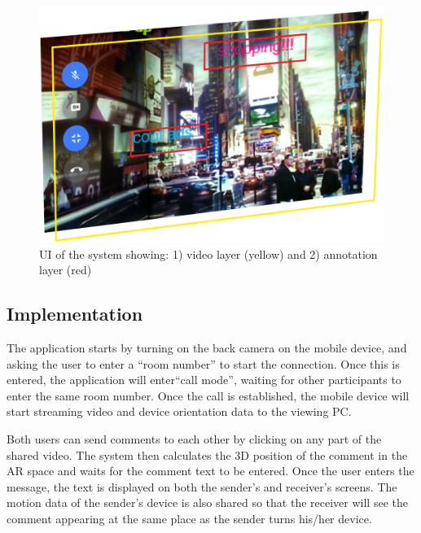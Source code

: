 \begin{figure}[h]
  \centering
  \includegraphics[width=.8\linewidth]{images/mgia16/layers.png}
  \caption{UI of the system showing: 1) video layer (yellow) and 2) annotation layer (red)}
	\label{fig:mgia16:layers}
\end{figure}

\subsection{Implementation}

The application starts by turning on the back camera on the mobile device, and asking the user to enter a “room number” to start the connection. Once this is entered, the application will enter``call mode'', waiting for other participants to enter the same room number. Once the call is established, the mobile device will start streaming video and device orientation data to the viewing PC. 

Both users can send comments to each other by clicking on any part of the shared video. The system then calculates the 3D position of the comment in the AR space and waits for the comment text to be entered. Once the user enters the message, the text is displayed on both the sender's and receiver's screens. The motion data of the sender's device is also shared so that the receiver will see the comment appearing at the same place as the sender turns his/her device. 


